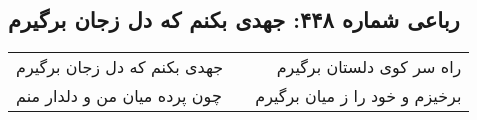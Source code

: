 \begin{center}
\section*{رباعی شماره ۴۴۸: جهدی بکنم که دل زجان برگیرم}
\label{sec:sh448}
\begin{longtable}{l p{0.5cm} r}
جهدی بکنم که دل زجان برگیرم
&&
راه سر کوی دلستان برگیرم
\\
چون پرده میان من و دلدار منم
&&
برخیزم و خود را ز میان برگیرم
\\
\end{longtable}
\end{center}
